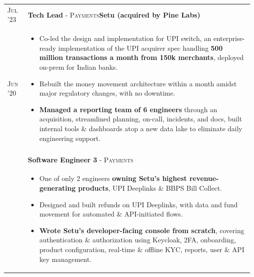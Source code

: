 \documentclass[a4paper,10pt]{extarticle} %
\begin{document}
\begin{tabularx}{\linewidth}{l | X}
\textsc{Jul '23} & \textbf{Tech Lead} \textsc{- Payments}\hfill\raisebox{-.2\height}{ \hspace{0.3em}}\textbf{Setu (acquired by Pine Labs)}\\
\textsc{Jun '20} & \begin{itemize}[leftmargin=*, nosep, before=\vspace{-1.0\baselineskip}, after=\vspace{-1.6\baselineskip}]
  \item Co-led the design and implementation for UPI switch, an enterprise-ready implementation of the UPI acquirer spec handling \textbf{500 million transactions a month from 150k merchants}, deployed on-prem for Indian banks.
  \item Rebuilt the money movement architecture within a month amidst major regulatory changes, with no downtime.
  \item \textbf{Managed a reporting team of 6 engineers} through an acquisition, streamlined planning, on-call, incidents, and docs, built internal tools \& dashboards atop a new data lake to eliminate daily engineering support.
\end{itemize}\\\\
& \textbf{Software Engineer 3} \textsc{- Payments}\\
& \begin{itemize}[leftmargin=*, nosep, before=\vspace{-1.0\baselineskip}, after=\vspace{-1.0\baselineskip}]
  \item One of only 2 engineers \textbf{owning Setu's highest revenue-generating products}, UPI Deeplinks \& BBPS Bill Collect.
  \item Designed and built refunds on UPI Deeplinks, with data and fund movement for automated \& API-initiated flows.
  \item \textbf{Wrote Setu's developer-facing console from scratch}, covering authentication \& authorization using Keycloak, 2FA, onboarding, product configuration, real-time \& offline KYC, reports, user \& API key management.

\end{itemize}
\end{tabularx}
\end{document}
